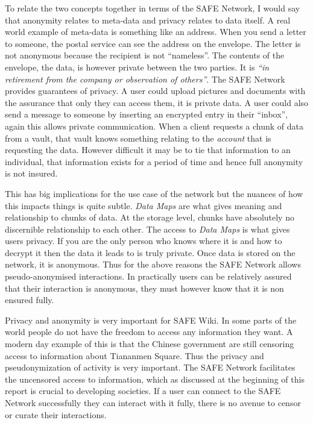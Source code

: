 To relate the two concepts together in terms of the SAFE Network, I would say that anonymity relates to meta-data and privacy relates to data itself. A real world example of meta-data is something like an address. When you send a letter to someone, the postal service can see the address on the envelope. The letter is not anonymous because the recipient is not ``nameless''. The contents of the envelope, the data, is however private between the two parties. It is \textit{``in retirement from the company or observation of others''}. The SAFE Network provides guarantees of privacy. A user could upload pictures and documents with the assurance that only they can access them, it is private data. A user could also send a message to someone by inserting an encrypted entry in their ``inbox'', again this allows private communication. When a client requests a chunk of data from a vault, that vault knows something relating to the \textit{account} that is requesting the data. However difficult it may be to tie that information to an individual, that information exists for a period of time and hence full anonymity is not insured.

This has big implications for the use case of the network but the nuances of how this impacts things is quite subtle. \textit{Data Maps} are what gives meaning and relationship to chunks of data. At the storage level, chunks have absolutely no discernible relationship to each other. The access to \textit{Data Maps} is what gives users privacy. If you are the only person who knows where it is and how to decrypt it then the data it leads to is truly private. Once data is stored on the network, it is anonymous. Thus for the above reasons the SAFE Network allows pseudo-anonymised interactions. In practically users can be relatively assured that their interaction is anonymous, they must however know that it is non ensured fully.

Privacy and anonymity is very important for SAFE Wiki. In some parts of the world people do not have the freedom to access any information they want. A modern day example of this is that the Chinese government are still censoring access to information about Tiananmen Square\cite{tiananmen-square}. Thus the privacy and pseudonymization of activity is very important. The SAFE Network facilitates the uncensored access to information, which as discussed at the beginning of this report is crucial to developing societies. If a user can connect to the SAFE Network successfully they can interact with it fully, there is no avenue to censor or curate their interactions.

